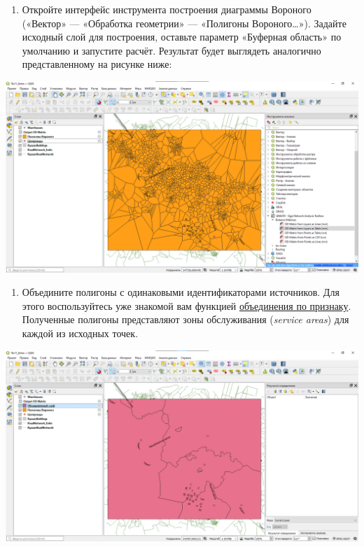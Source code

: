\documentclass[
  12pt,
]{book}
\providecommand{\tightlist}{%
  \setlength{\itemsep}{0pt}\setlength{\parskip}{0pt}}
\begin{document}
\begin{enumerate}
\def\labelenumi{\arabic{enumi}.}
\setcounter{enumi}{10}
\tightlist
\item
  Откройте интерфейс инструмента построения диаграммы Вороного («Вектор» --- «Обработка геометрии» --- «Полигоны Вороного\ldots»). Задайте исходный слой для построения, оставьте параметр «Буферная область» по умолчанию и запустите расчёт. Результат будет выглядеть аналогично представленному на рисунке ниже:
\end{enumerate}

\includegraphics{images/Ex11_RoadNetwork/VoronoyDiagram.png}

\begin{enumerate}
\def\labelenumi{\arabic{enumi}.}
\setcounter{enumi}{11}
\tightlist
\item
  Объедините полигоны с одинаковыми идентификаторами источников. Для этого воспользуйтесь уже знакомой вам функцией \protect\hyperlink{overlay-merge}{объединения по признаку}. Полученные полигоны представляют зоны обслуживания (\emph{service areas}) для каждой из исходных точек.
\end{enumerate}

\includegraphics{images/Ex11_RoadNetwork/VoronoyDiagram2.png}
\end{document}
